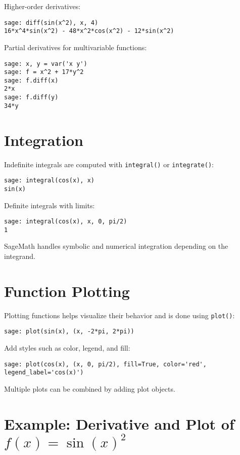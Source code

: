 \documentclass[12pt]{book}
\begin{document}
Higher-order derivatives:

\begin{verbatim}
sage: diff(sin(x^2), x, 4)
16*x^4*sin(x^2) - 48*x^2*cos(x^2) - 12*sin(x^2)
\end{verbatim}

Partial derivatives for multivariable functions:

\begin{verbatim}
sage: x, y = var('x y')
sage: f = x^2 + 17*y^2
sage: f.diff(x)
2*x
sage: f.diff(y)
34*y
\end{verbatim}

\section{Integration}

Indefinite integrals are computed with \texttt{integral()} or \texttt{integrate()}:

\begin{verbatim}
sage: integral(cos(x), x)
sin(x)
\end{verbatim}

Definite integrals with limits:

\begin{verbatim}
sage: integral(cos(x), x, 0, pi/2)
1
\end{verbatim}

SageMath handles symbolic and numerical integration depending on the integrand.

\section{Function Plotting}

Plotting functions helps visualize their behavior and is done using \texttt{plot()}:

\begin{verbatim}
sage: plot(sin(x), (x, -2*pi, 2*pi))
\end{verbatim}

Add styles such as color, legend, and fill:

\begin{verbatim}
sage: plot(cos(x), (x, 0, pi/2), fill=True, color='red', legend_label='cos(x)')
\end{verbatim}

Multiple plots can be combined by adding plot objects.

\section{Example: Derivative and Plot of \( f(x) = \sin(x)^2 \)}
\end{document}
